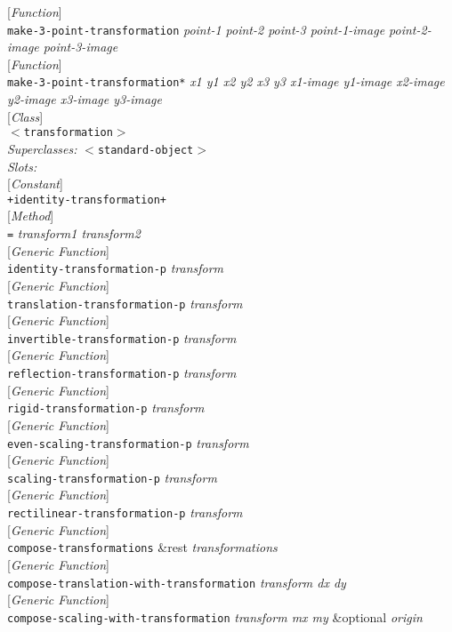 \documentclass[10pt]{book}
\newenvironment{defother}[2]{[\textit{#1}]\\\texttt{#2}}{\\}
\newenvironment{defun}[1]{\begin{defother}{Function}{#1}}{\end{defother}}
\newenvironment{defgeneric}[1]{\begin{defother}{Generic Function}{#1}}{\end{defother}}
\newenvironment{defmethod}[1]{\begin{defother}{Method}{#1}}{\end{defother}}
\newenvironment{defconstant}[1]{\begin{defother}{Constant}{#1}}{\end{defother}}
\newenvironment{defclass}[2]{[\textit{Class}]\\\texttt{#1}\\\textit{Superclasses:} \texttt{#2}\\\textit{Slots:}}{\\}
\begin{document}
\begin{defun}{make-3-point-transformation} \textit{point-1 point-2 point-3 point-1-image point-2-image point-3-image}\end{defun}
\begin{defun}{make-3-point-transformation*} \textit{x1 y1 x2 y2 x3 y3 x1-image y1-image x2-image y2-image x3-image y3-image}\end{defun}
\begin{defclass}{$<$transformation$>$}{$<$standard-object$>$}\end{defclass}
\begin{defconstant}{+identity-transformation+}\end{defconstant}
\begin{defmethod}{=} \textit{transform1 transform2}\end{defmethod}
\begin{defgeneric}{identity-transformation-p} \textit{transform}\end{defgeneric}
\begin{defgeneric}{translation-transformation-p} \textit{transform}\end{defgeneric}
\begin{defgeneric}{invertible-transformation-p} \textit{transform}\end{defgeneric}
\begin{defgeneric}{reflection-transformation-p} \textit{transform}\end{defgeneric}
\begin{defgeneric}{rigid-transformation-p} \textit{transform}\end{defgeneric}
\begin{defgeneric}{even-scaling-transformation-p} \textit{transform}\end{defgeneric}
\begin{defgeneric}{scaling-transformation-p} \textit{transform}\end{defgeneric}
\begin{defgeneric}{rectilinear-transformation-p} \textit{transform}\end{defgeneric}
\begin{defgeneric}{compose-transformations} \&rest \textit{transformations}\end{defgeneric}
\begin{defgeneric}{compose-translation-with-transformation} \textit{transform dx dy}\end{defgeneric}
\begin{defgeneric}{compose-scaling-with-transformation} \textit{transform mx my} \&optional \textit{origin}\end{defgeneric}
\end{document}
